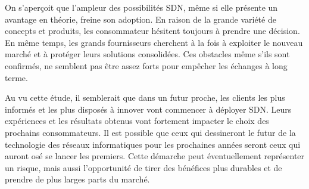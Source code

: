 On s'aperçoit que l'ampleur des possibilités SDN, même si elle présente un avantage en théorie, freine son adoption. En raison de la grande variété de concepts et produits, les consommateur hésitent toujours à prendre une décision. En même temps, les grands fournisseurs cherchent à la fois à exploiter le nouveau marché et à protéger leurs solutions consolidées. Ces obstacles même s'ils sont confirmés, ne semblent pas être assez forts pour empêcher les échanges à long terme.

Au vu cette étude, il semblerait que dans un futur proche, les clients les plus informés et les plus disposés à innover vont commencer à déployer SDN. Leurs expériences et les résultats obtenus  vont fortement impacter le choix des prochains consommateurs. Il est possible que  ceux qui dessineront le futur de la technologie des réseaux informatiques pour les prochaines années seront ceux qui auront osé se lancer les premiers. Cette démarche peut éventuellement représenter un risque, mais aussi l'opportunité de tirer des bénéfices plus durables et de prendre de plus larges parts du marché. 